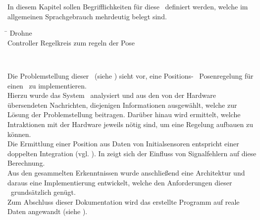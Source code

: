 
In diesem Kapitel sollen Begrifflichkeiten für diese \Arbeit\ definiert werden, welche im allgemeinen Sprachgebrauch mehrdeutig belegt sind.

\begin{tabbing}
\hspace{5cm} \= \kill
Drohne \> \Quad\\
Controller \> Regelkreis zum regeln der Pose

\end{tabbing}
\missing\


Die Problemstellung dieser \Arbeit\ (siehe ) sieht vor, eine Positions- \bzw\ Posenregelung für einen \Quad\ zu implementieren.\\
Hierzu wurde das System \Quad\ analysiert und aus den von der Hardware übersendeten Nachrichten, diejenigen Informationen ausgewählt, welche zur Lösung der Problemstellung beitragen. Darüber hinau wird ermittelt, welche Intraktionen mit der Hardware jeweils nötig sind, um eine Regelung aufbauen zu können.\\
Die Ermittlung einer Position aus Daten von Initialsensoren entspricht einer doppelten Integration (vgl. ). In  zeigt sich der Einfluss von Signalfehlern auf diese Berechnung.\\
Aus den gesammelten Erkenntnissen wurde anschließend eine Architektur und daraus eine Implementierung entwickelt, welche den Anforderungen dieser \Arbeit\ grundsätzlich genügt.\\
Zum Abschluss dieser Dokumentation wird das erstellte Programm auf reale Daten angewandt (siehe ).
